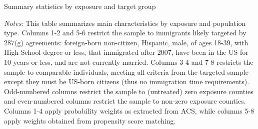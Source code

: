 \documentclass{article}
\begin{document}
\newpage
\begin{landscape}
\begin{table}[h]

\caption{Summary statistics by exposure and target group}
\label{tab:sumstat}
\end{table}

\justifying
\begin{spacing}{1}
\begin{footnotesize}
\noindent \textit{Notes:} This table summarizes main characteristics by exposure and population type. Columns 1-2 and 5-6 restrict the sample to immigrants likely targeted by 287(g) agreements: foreign-born non-citizen, Hispanic, male, of ages 18-39, with High School degree or less, that immigrated after 2007, have been in the US for 10 years or less, and are not currently married. Columns 3-4 and 7-8 restricts the sample to comparable individuals, meeting all criteria from the targeted sample except they must be US-born citizens (thus no immigration time requirements). Odd-numbered columns restrict the sample to (untreated) zero exposure counties and even-numbered columns restrict the sample to non-zero exposure counties. Columns 1-4 apply probability weights as extracted from ACS, while columns 5-8 apply weights obtained from propensity score matching.
\end{footnotesize}
\end{spacing}
\end{landscape}
\end{document}
